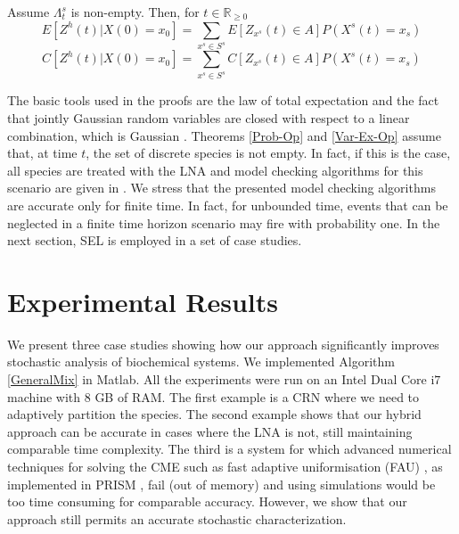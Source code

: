 \documentclass{llncs}
\begin{document}
\begin{theorem}\label{Var-Ex-Op}
Assume $\Lambda^s_t$ is non-empty. Then, for $t\in \mathbb{R}_{\geq 0}$
\begin{equation*}
E[Z^h(t)|X(0)=x_0]=\sum_{x^s \in S^s} E[Z_{x^s}(t)\in A]P(X^s(t)=x_s)
\end{equation*}
\begin{equation*}
C[Z^h(t)|X(0)=x_0]=\sum_{x^s \in S^s} C[Z_{x^s}(t)\in A]P(X^s(t)=x_s)
\end{equation*}
\end{theorem}
 The basic tools used in the proofs are the law of total expectation and the fact that jointly Gaussian random variables are closed with respect to a linear combination, which is Gaussian \cite{adler1990introduction}.  Theorems \ref{Prob-Op} and \ref{Var-Ex-Op} assume that, at time $t$, the set of discrete species is not empty. In fact, if this is the case, all species are treated with the LNA and model checking algorithms for this scenario are given in \cite{cardelli2015stochastic}. { We stress that the presented model checking algorithms are accurate only for finite time. In fact, for unbounded time, events that can be neglected in a finite time horizon scenario may fire with probability one.} In the next section, SEL is employed in a set of case studies.

\section{Experimental Results}\label{sec:exper}

We present three case studies showing how our approach significantly improves stochastic analysis of biochemical systems.
We implemented Algorithm \ref{GeneralMix} in Matlab. All the experiments were run on an Intel Dual Core i$7$ machine with $8$ GB of RAM. The first example is a CRN where we need to adaptively partition the species. The second example shows that our hybrid approach can be accurate in cases where the LNA is not, still maintaining comparable time complexity. The third is a system for which advanced numerical techniques for solving the CME such as fast adaptive uniformisation (FAU) \cite{didier2009fast}, as implemented in PRISM \cite{KNP11}, fail (out of memory) and using simulations would be too time consuming for comparable accuracy. However, we show that our approach still permits an accurate stochastic characterization. %
\end{document}
